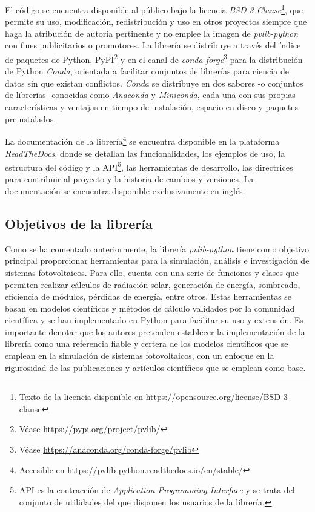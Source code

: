 El código se encuentra disponible al público bajo la licencia \textit{BSD 3-Clause}\footnote{Texto de la licencia disponible en \url{https://opensource.org/license/BSD-3-clause}}, que permite su uso, modificación, redistribución y uso en otros proyectos siempre que haga la atribución de autoría pertinente y no emplee la imagen de \textit{pvlib-python} con fines publicitarios o promotores. La librería se distribuye a través del índice de paquetes de Python, PyPI\footnote{Véase \url{https://pypi.org/project/pvlib/}} y en el canal de \textit{conda-forge}\footnote{Véase \url{https://anaconda.org/conda-forge/pvlib}} para la distribución de Python \textit{Conda}, orientada a facilitar conjuntos de librerías para ciencia de datos sin que existan conflictos. \textit{Conda} se distribuye en dos sabores -o conjuntos de librerías- conocidas como \textit{Anaconda} y \textit{Miniconda}, cada una con sus propias características y ventajas en tiempo de instalación, espacio en disco y paquetes preinstalados.

La documentación de la librería\footnote{Accesible en \url{https://pvlib-python.readthedocs.io/en/stable/}} se encuentra disponible en la plataforma\\ \mbox{\textit{ReadTheDocs}}, donde se detallan las funcionalidades, los ejemplos de uso, la estructura del código y la API\footnote{API es la contracción de \textit{Application Programming Interface} y se trata del conjunto de utilidades del que disponen los usuarios de la librería.}, las herramientas de desarrollo, las directrices para contribuir al proyecto y la historia de cambios y versiones. La documentación se encuentra disponible exclusivamente en inglés.

\subsection{Objetivos de la librería} \label{ssct:pvlib:objetivos}

Como se ha comentado anteriormente, la librería \textit{pvlib-python} tiene como objetivo principal proporcionar herramientas para la simulación, análisis e investigación de sistemas fotovoltaicos. Para ello, cuenta con una serie de funciones y clases que permiten realizar cálculos de radiación solar, generación de energía, sombreado, eficiencia de módulos, pérdidas de energía, entre otros. Estas herramientas se basan en modelos científicos y métodos de cálculo validados por la comunidad científica y se han implementado en Python para facilitar su uso y extensión. Es importante denotar que los autores pretenden establecer la implementación de la librería como una referencia fiable y certera de los modelos científicos que se emplean en la simulación de sistemas fotovoltaicos, con un enfoque en la rigurosidad de las publicaciones y artículos científicos que se emplean como base.

